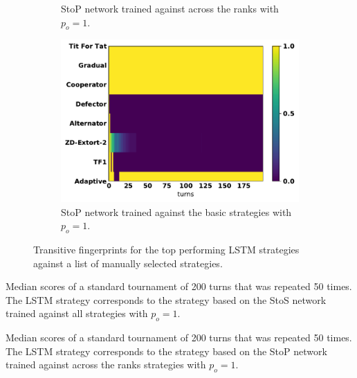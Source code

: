 \begin{figure}[!htbp]
\begin{subfigure}{.32\textwidth}
        \caption{StoP network trained
        against across the ranks with $p_o=1$.}
    \end{subfigure}\hfill
    \begin{subfigure}{.32\textwidth}
        \includegraphics[width=\textwidth]{src/chapters/07/img/s_t_p_basic_against_seven_opponents.pdf}
        \caption{StoP network trained
        against the basic strategies with $p_o=1$.}
    \end{subfigure}
    \caption{Transitive fingerprints for the top performing LSTM strategies against
    a list of manually selected strategies.}\label{fig:transitive_fingerprints_against_seven}
\end{figure}

\begin{table}[!htbp]
    \begin{center}
    \resizebox{\textwidth}{!}{
        
    }
\end{center}
\caption{Median scores of a standard tournament of 200 turns that was repeated
50 times. The LSTM strategy corresponds to the strategy based on the StoS
network trained against all strategies with
$p_o=1$.}\label{table:scores_s_to_s_against_seven}
\end{table}

\begin{table}[!htbp]
    \begin{center}
    \resizebox{\textwidth}{!}{
        
    }
\end{center}
\caption{Median scores of a standard tournament of 200 turns that was repeated
50 times. The LSTM strategy corresponds to the strategy based on the StoP
network trained against across the ranks strategies with
$p_o=1$.}\label{table:scores_s_to_p_twenty_against_seven}
\end{table}

